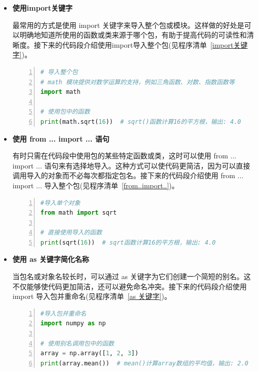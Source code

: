 \begin{itemize}
\item \textbf{使用import关键字}

最常用的方式是使用 import 关键字来导入整个包或模块。这样做的好处是可以明确地知道所使用的函数或类来源于哪个包，有助于提高代码的可读性和清晰度。接下来的代码段介绍使用import导入整个包(见程序清单~\ref{import关键字})。

\begin{lstlisting}[language={python},label={import关键字},caption={import关键字}, basicstyle=\footnotesize\ttfamily, breaklines=true, numbers=left, frame=single]
# 导入整个包
# math 模块提供对数学运算的支持，例如三角函数、对数、指数函数等
import math

# 使用包中的函数
print(math.sqrt(16))  # sqrt()函数计算16的平方根，输出: 4.0
\end{lstlisting}

\item \textbf{使用 from ... import ... 语句}

有时只需在代码段中使用包的某些特定函数或类，这时可以使用 from ... import ... 语句来有选择地导入。这种方式可以使代码更简洁，因为可以直接调用导入的对象而不必每次都指定包名。接下来的代码段介绍使用 from ... import ... 导入整个包(见程序清单~\ref{from..import..})。

\begin{lstlisting}[language={python},label={from..import..},caption={from..import..}, basicstyle=\footnotesize\ttfamily, breaklines=true, numbers=left, frame=single]
#导入单个对象
from math import sqrt

# 直接使用导入的函数
print(sqrt(16))  # sqrt函数计算16的平方根，输出: 4.0

\end{lstlisting}

\item \textbf{使用 as 关键字简化名称}

当包名或对象名较长时，可以通过 as 关键字为它们创建一个简短的别名。这不仅能够使代码更加简洁，还可以避免命名冲突。接下来的代码段介绍使用 import 导入包并重命名(见程序清单~\ref{as 关键字})。
\begin{lstlisting}[language={python},label={as 关键字},caption={as 关键字}, basicstyle=\footnotesize\ttfamily, breaklines=true, numbers=left, frame=single,keepspaces=true,showstringspaces=false]
#导入包并重命名
import numpy as np

# 使用别名调用包中的函数
array = np.array([1, 2, 3])
print(array.mean())  # mean()计算array数组的平均值，输出: 2.0

\end{lstlisting}
\end{itemize}

